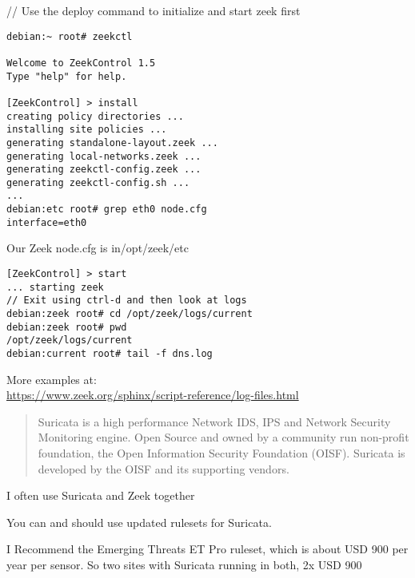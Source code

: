 \documentclass[Screen16to9,17pt]{foils}
\begin{document}

// Use the deploy command to initialize and start zeek first
\begin{verbatim}
debian:~ root# zeekctl

Welcome to ZeekControl 1.5
Type "help" for help.

[ZeekControl] > install
creating policy directories ...
installing site policies ...
generating standalone-layout.zeek ...
generating local-networks.zeek ...
generating zeekctl-config.zeek ...
generating zeekctl-config.sh ...
...
debian:etc root# grep eth0 node.cfg
interface=eth0
\end{verbatim}

\centerline{Our Zeek node.cfg is in/opt/zeek/etc}


\begin{verbatim}
[ZeekControl] > start
... starting zeek
// Exit using ctrl-d and then look at logs
debian:zeek root# cd /opt/zeek/logs/current
debian:zeek root# pwd
/opt/zeek/logs/current
debian:current root# tail -f dns.log
\end{verbatim}

More examples at:\\
\url{https://www.zeek.org/sphinx/script-reference/log-files.html}




\begin{quote}
Suricata is a high performance Network IDS, IPS and Network Security Monitoring engine. Open Source and owned by a community run non-profit foundation, the Open Information Security Foundation (OISF). Suricata is developed by the OISF and its supporting vendors.
\end{quote}


\centerline{I often use Suricata and Zeek together}



You can and should use updated rulesets for Suricata.

I Recommend the Emerging Threats ET Pro ruleset, which is about USD 900 per year per sensor. So two sites with Suricata running in both, 2x USD 900


\end{document}
